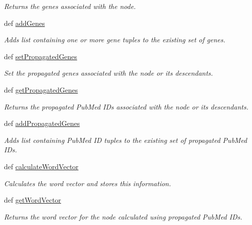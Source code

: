 \begin{DoxyCompactItemize}
\begin{DoxyCompactList}\small\item\em Returns the genes associated with the node. \end{DoxyCompactList}\item 
def \hyperlink{classgographer_1_1_g_o_node_1_1_g_o_node_a35be18174f995d9e7db5d23c9cc33189}{add\-Genes}
\begin{DoxyCompactList}\small\item\em Adds list containing one or more gene tuples to the existing set of genes. \end{DoxyCompactList}\item 
def \hyperlink{classgographer_1_1_g_o_node_1_1_g_o_node_aca565668e8254fcf8f360c2600d0f46a}{set\-Propagated\-Genes}
\begin{DoxyCompactList}\small\item\em Set the propagated genes associated with the node or its descendants. \end{DoxyCompactList}\item 
\hypertarget{classgographer_1_1_g_o_node_1_1_g_o_node_a6cf34da2a1bc2b352bc9afa7bf036a3b}{def \hyperlink{classgographer_1_1_g_o_node_1_1_g_o_node_a6cf34da2a1bc2b352bc9afa7bf036a3b}{get\-Propagated\-Genes}}\label{classgographer_1_1_g_o_node_1_1_g_o_node_a6cf34da2a1bc2b352bc9afa7bf036a3b}

\begin{DoxyCompactList}\small\item\em Returns the propagated Pub\-Med I\-Ds associated with the node or its descendants. \end{DoxyCompactList}\item 
def \hyperlink{classgographer_1_1_g_o_node_1_1_g_o_node_aeb00c6a4aa408924966538817a55986d}{add\-Propagated\-Genes}
\begin{DoxyCompactList}\small\item\em Adds list containing Pub\-Med I\-D tuples to the existing set of propagated Pub\-Med I\-Ds. \end{DoxyCompactList}\item 
def \hyperlink{classgographer_1_1_g_o_node_1_1_g_o_node_a2be192d1d3bc2deb5396f767979a734c}{calculate\-Word\-Vector}
\begin{DoxyCompactList}\small\item\em Calculates the word vector and stores this information. \end{DoxyCompactList}\item 
def \hyperlink{classgographer_1_1_g_o_node_1_1_g_o_node_a75a632f9731e5a09cecab3b36bc232b1}{get\-Word\-Vector}
\begin{DoxyCompactList}\small\item\em Returns the word vector for the node calculated using propagated Pub\-Med I\-Ds. \end{DoxyCompactList}\end{DoxyCompactItemize}
